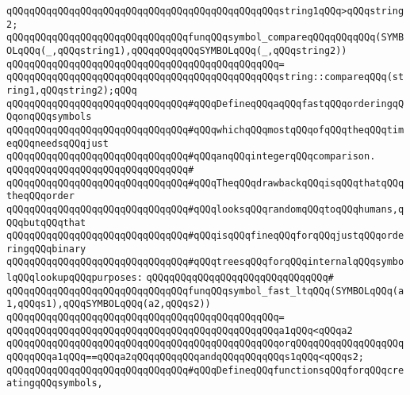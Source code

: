 \verb|qQQqqQQqqQQqqQQqqQQqqQQqqQQqqQQqqQQqqQQqqQQqqQQqstring1qQQq>qQQqstring2;|\newline
\newline
\verb|qQQqqQQqqQQqqQQqqQQqqQQqqQQqqQQqfunqQQqsymbol_compareqQQqqQQqqQQq(SYMBOLqQQq(_,qQQqstring1),qQQqqQQqqQQqSYMBOLqQQq(_,qQQqstring2))|\newline
\verb|qQQqqQQqqQQqqQQqqQQqqQQqqQQqqQQqqQQqqQQqqQQqqQQq=|\newline
\verb|qQQqqQQqqQQqqQQqqQQqqQQqqQQqqQQqqQQqqQQqqQQqqQQqstring::compareqQQq(string1,qQQqstring2);qQQq|\newline
\newline
\verb|qQQqqQQqqQQqqQQqqQQqqQQqqQQqqQQq#qQQqDefineqQQqaqQQqfastqQQqorderingqQQqonqQQqsymbols|\newline
\verb|qQQqqQQqqQQqqQQqqQQqqQQqqQQqqQQq#qQQqwhichqQQqmostqQQqofqQQqtheqQQqtimeqQQqneedsqQQqjust|\newline
\verb|qQQqqQQqqQQqqQQqqQQqqQQqqQQqqQQq#qQQqanqQQqintegerqQQqcomparison.|\newline
\verb|qQQqqQQqqQQqqQQqqQQqqQQqqQQqqQQq#|\newline
\verb|qQQqqQQqqQQqqQQqqQQqqQQqqQQqqQQq#qQQqTheqQQqdrawbackqQQqisqQQqthatqQQqtheqQQqorder|\newline
\verb|qQQqqQQqqQQqqQQqqQQqqQQqqQQqqQQq#qQQqlooksqQQqrandomqQQqtoqQQqhumans,qQQqbutqQQqthat|\newline
\verb|qQQqqQQqqQQqqQQqqQQqqQQqqQQqqQQq#qQQqisqQQqfineqQQqforqQQqjustqQQqorderingqQQqbinary|\newline
\verb|qQQqqQQqqQQqqQQqqQQqqQQqqQQqqQQq#qQQqtreesqQQqforqQQqinternalqQQqsymbolqQQqlookupqQQqpurposes:|\newline
\verb|qQQqqQQqqQQqqQQqqQQqqQQqqQQqqQQq#|\newline
\verb|qQQqqQQqqQQqqQQqqQQqqQQqqQQqqQQqfunqQQqsymbol_fast_ltqQQq(SYMBOLqQQq(a1,qQQqs1),qQQqSYMBOLqQQq(a2,qQQqs2))|\newline
\verb|qQQqqQQqqQQqqQQqqQQqqQQqqQQqqQQqqQQqqQQqqQQqqQQq=|\newline
\verb|qQQqqQQqqQQqqQQqqQQqqQQqqQQqqQQqqQQqqQQqqQQqqQQqa1qQQq<qQQqa2|\newline
\verb|qQQqqQQqqQQqqQQqqQQqqQQqqQQqqQQqqQQqqQQqqQQqqQQqorqQQqqQQqqQQqqQQqqQQqqQQqqQQqa1qQQq==qQQqa2qQQqqQQqqQQqandqQQqqQQqqQQqs1qQQq<qQQqs2;|\newline
\newline
\newline
\newline
\verb|qQQqqQQqqQQqqQQqqQQqqQQqqQQqqQQq#qQQqDefineqQQqfunctionsqQQqforqQQqcreatingqQQqsymbols,|\newline
